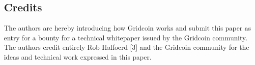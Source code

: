 \subsection{Credits}
\label{sec:credits}

The authors are hereby introducing how Gridcoin works and submit this paper as entry for a bounty for a technical whitepaper issued by the Gridcoin community. The authors credit entirely Rob Halfoerd [3] and the Gridcoin community for the ideas and technical work expressed in this paper.